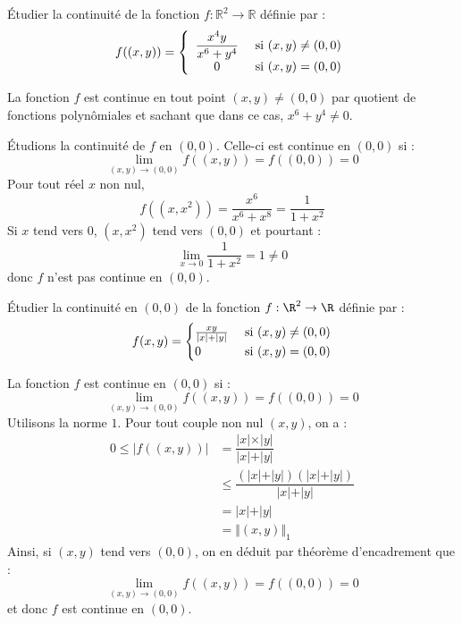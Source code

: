 \documentclass[a4paper,10pt]{report}
\begin{document}
\begin{Exa} Étudier la continuité de la fonction $f : \mathbb{R}^2 \rightarrow \mathbb{R}$ définie par :
$$ f((x,y)) = \left\lbrace \begin{array}{cl}
\dfrac{x^4 y}{x^6+y^4} & \hbox{ si } (x,y) \neq (0,0) \\
0 & \hbox{ si } (x,y)=(0,0) \\
\end{array}\right.$$
\end{Exa}

\corr La fonction $f$ est continue en tout point $(x,y) \neq (0,0)$ par quotient de fonctions polynômiales et sachant que dans ce cas, $x^6+y^4 \neq 0$. 

\medskip

\noindent Étudions la continuité de $f$ en $(0,0)$. Celle-ci est continue en $(0,0)$ si :
$$ \lim_{(x,y) \rightarrow (0,0)} f((x,y)) =f((0,0))= 0$$
Pour tout réel $x$ non nul,
$$ f((x,x^2)) = \dfrac{x^6}{x^6+x^8} = \dfrac{1}{1+x^2}$$
Si $x$ tend vers $0$, $(x,x^2)$ tend vers $(0,0)$ et pourtant :
$$ \lim_{x \rightarrow 0} \dfrac{1}{1+x^2} = 1 \neq 0$$
donc $f$ n'est pas continue en $(0,0)$.

\begin{Exa} Étudier la continuité en $(0,0)$ de la fonction $f : \R^{2} \rightarrow \R$ définie par :
  \[
  f(x,y) =
  \begin{cases}
    \frac{xy}{\vert x \vert + \vert y \vert} & \hbox{ si } (x,y) \neq (0,0) \\
    0 & \hbox{ si } (x,y)=(0,0)
  \end{cases}
  \]
\end{Exa}

\corr La fonction $f$ est continue en $(0,0)$ si :
$$ \lim_{(x,y) \rightarrow (0,0)} f((x,y)) =f((0,0))= 0$$
Utilisons la norme $1$. Pour tout couple non nul $(x,y)$, on a :
\begin{align*}
0 \leq \vert f((x,y)) \vert & = \dfrac{\vert x \vert \times \vert y \vert}{\vert x \vert + \vert y \vert} \\
& \leq \dfrac{(\vert x \vert + \vert y \vert)(\vert x \vert + \vert y \vert)}{\vert x \vert + \vert y \vert} \\
& = \vert x \vert + \vert y \vert \\
& = \Vert (x,y) \Vert_1
\end{align*}
Ainsi, si $(x,y)$ tend vers $(0,0)$, on en déduit par théorème d'encadrement que :
$$  \lim_{(x,y) \rightarrow (0,0)} f((x,y)) =f((0,0))= 0$$
et donc $f$ est continue en $(0,0)$.
\end{document}

